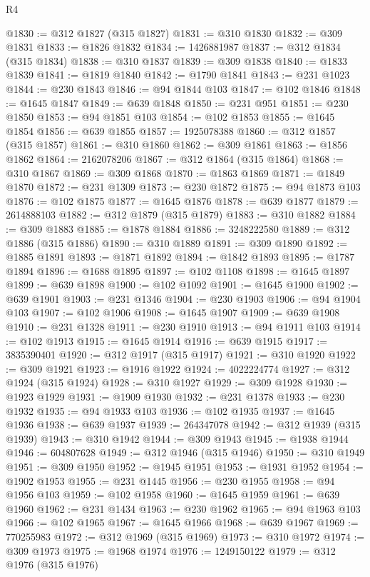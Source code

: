 \begin{lexlean}{R4}
\begin{coremodule}
@1830 := @312 @1827 (@315 @1827)
@1831 := @310 @1830
@1832 := @309 @1831
@1833 := @1826 @1832
@1834 := 1426881987
@1837 := @312 @1834 (@315 @1834)
@1838 := @310 @1837
@1839 := @309 @1838
@1840 := @1833 @1839
@1841 := @1819 @1840
@1842 := @1790 @1841
@1843 := @231 @1023
@1844 := @230 @1843
@1846 := @94 @1844 @103
@1847 := @102 @1846
@1848 := @1645 @1847
@1849 := @639 @1848
@1850 := @231 @951
@1851 := @230 @1850
@1853 := @94 @1851 @103
@1854 := @102 @1853
@1855 := @1645 @1854
@1856 := @639 @1855
@1857 := 1925078388
@1860 := @312 @1857 (@315 @1857)
@1861 := @310 @1860
@1862 := @309 @1861
@1863 := @1856 @1862
@1864 := 2162078206
@1867 := @312 @1864 (@315 @1864)
@1868 := @310 @1867
@1869 := @309 @1868
@1870 := @1863 @1869
@1871 := @1849 @1870
@1872 := @231 @1309
@1873 := @230 @1872
@1875 := @94 @1873 @103
@1876 := @102 @1875
@1877 := @1645 @1876
@1878 := @639 @1877
@1879 := 2614888103
@1882 := @312 @1879 (@315 @1879)
@1883 := @310 @1882
@1884 := @309 @1883
@1885 := @1878 @1884
@1886 := 3248222580
@1889 := @312 @1886 (@315 @1886)
@1890 := @310 @1889
@1891 := @309 @1890
@1892 := @1885 @1891
@1893 := @1871 @1892
@1894 := @1842 @1893
@1895 := @1787 @1894
@1896 := @1688 @1895
@1897 := @102 @1108
@1898 := @1645 @1897
@1899 := @639 @1898
@1900 := @102 @1092
@1901 := @1645 @1900
@1902 := @639 @1901
@1903 := @231 @1346
@1904 := @230 @1903
@1906 := @94 @1904 @103
@1907 := @102 @1906
@1908 := @1645 @1907
@1909 := @639 @1908
@1910 := @231 @1328
@1911 := @230 @1910
@1913 := @94 @1911 @103
@1914 := @102 @1913
@1915 := @1645 @1914
@1916 := @639 @1915
@1917 := 3835390401
@1920 := @312 @1917 (@315 @1917)
@1921 := @310 @1920
@1922 := @309 @1921
@1923 := @1916 @1922
@1924 := 4022224774
@1927 := @312 @1924 (@315 @1924)
@1928 := @310 @1927
@1929 := @309 @1928
@1930 := @1923 @1929
@1931 := @1909 @1930
@1932 := @231 @1378
@1933 := @230 @1932
@1935 := @94 @1933 @103
@1936 := @102 @1935
@1937 := @1645 @1936
@1938 := @639 @1937
@1939 := 264347078
@1942 := @312 @1939 (@315 @1939)
@1943 := @310 @1942
@1944 := @309 @1943
@1945 := @1938 @1944
@1946 := 604807628
@1949 := @312 @1946 (@315 @1946)
@1950 := @310 @1949
@1951 := @309 @1950
@1952 := @1945 @1951
@1953 := @1931 @1952
@1954 := @1902 @1953
@1955 := @231 @1445
@1956 := @230 @1955
@1958 := @94 @1956 @103
@1959 := @102 @1958
@1960 := @1645 @1959
@1961 := @639 @1960
@1962 := @231 @1434
@1963 := @230 @1962
@1965 := @94 @1963 @103
@1966 := @102 @1965
@1967 := @1645 @1966
@1968 := @639 @1967
@1969 := 770255983
@1972 := @312 @1969 (@315 @1969)
@1973 := @310 @1972
@1974 := @309 @1973
@1975 := @1968 @1974
@1976 := 1249150122
@1979 := @312 @1976 (@315 @1976)

\end{coremodule}
\end{lexlean}
